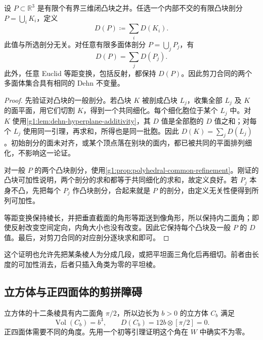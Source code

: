 \begin{theorem}
	\label{g1:thm:dehn-dissection-invariance}
	设 \(P\subset\mathbb R^3\) 是有限个有界三维闭凸块之并。任选一个内部不交的有限凸块剖分 \(P=\bigcup_i K_i\)，定义
	\[
		D(P)\coloneqq\sum_iD(K_i).
	\]
	此值与所选剖分无关。对任意有限多面体剖分 \(P=\bigcup_jP_j\)，有
	\[
		D(P)=\sum_jD(P_j).
	\]
	此外，任意 Euclid 等距变换，包括反射，都保持 \(D(P)\)。因此剪刀合同的两个多面体集合具有相同的 Dehn 不变量。
\end{theorem}
\begin{proof}
	先验证对凸块的一般剖分。若凸块 \(K\) 被剖成凸块 \(L_j\)，收集全部 \(L_j\) 及 \(K\) 的面平面，用它们切割 \(K\)，得到一个共同细化。每个细化胞位于某个 \(L_j\) 中。对 \(K\) 使用\cref{g1:lem:dehn-hyperplane-additivity}，其 \(D\) 值是全部胞的 \(D\) 值之和；对每个 \(L_j\) 使用同一引理，再求和，所得也是同一批胞。因此 \(D(K)=\sum_jD(L_j)\)。初始剖分的面未对齐，或某个顶点落在别块的面内，都已被共同的平面排列细化，不影响这一论证。

	对一般 \(P\) 的两个凸块剖分，使用\cref{g1:prop:polyhedral-common-refinement}。刚证的凸块可加性说明，两个剖分的求和都等于共同细化的求和，故定义良好。若 \(P_j\) 本身不凸，先把每个 \(P_j\) 作凸块剖分，合起来就是 \(P\) 的剖分，由定义无关性便得到所列可加性。

	等距变换保持棱长，并把垂直截面的角形等距送到像角形，所以保持内二面角；即使反射改变空间定向，内角大小也没有改变。因此它保持每个凸块及一般 \(P\) 的 \(D\) 值。最后，对剪刀合同的对应剖分逐块求和即可。
\end{proof}

这个证明也允许先把某条棱人为分成几段，或把平坦面三角化后再细切。前者由长度的可加性消去，后者只插入角类为零的平坦棱。

\subsection{立方体与正四面体的剪拼障碍}
\label{g1:subsec:E05:04}

立方体的十二条棱具有内二面角 \(\pi/2\)，所以边长为 \(b>0\) 的立方体 \(C_b\) 满足
\[
	\operatorname{Vol}(C_b)=b^3,\qquad
	D(C_b)=12b\otimes[\pi/2]=0.
\]
正四面体需要不同的角度。先用一个初等引理证明这个角在 \(W\) 中确实不为零。

